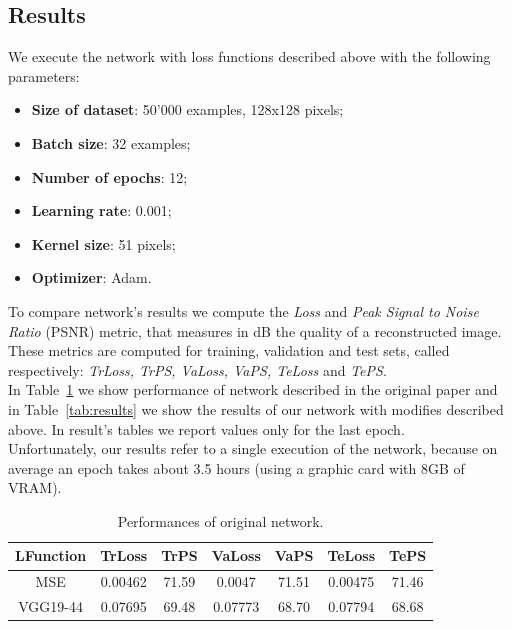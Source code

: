\documentclass[11pt, a4paper]{article}
\begin{document}
	\subsection{Results}
	We execute the network with loss functions described above with the following parameters:
	\begin{itemize}
		\item \textbf{Size of dataset}: 50'000 examples, 128x128 pixels;
		\item \textbf{Batch size}: 32 examples;
		\item \textbf{Number of epochs}: 12;
		\item \textbf{Learning rate}: 0.001;
		\item \textbf{Kernel size}: 51 pixels;
		\item \textbf{Optimizer}: Adam.
	\end{itemize}
	To compare network's results we compute the \textit{Loss} and \textit{Peak Signal to Noise Ratio} (PSNR) metric, that measures in dB the quality of a reconstructed image. These metrics are computed for training, validation and test sets, called respectively: \textit{TrLoss, TrPS, VaLoss, VaPS, TeLoss} and \textit{TePS}.\\
	In Table~\ref{tab:old_results} we show performance of network described in the original paper \cite{mainpaper} and in Table~\ref{tab:results} we show the results of our network with modifies described above. In result's tables we report values only for the last epoch.\\
	Unfortunately, our results refer to a single execution of the network, because on average an epoch takes about 3.5 hours (using a graphic card with 8GB of VRAM). 

	\begin{table}
		\centering
		\begin{tabular}{|c|c|c|c|c|c|c|}
			\hline
			\textbf{LFunction} & \textbf{TrLoss} & \textbf{TrPS} & \textbf{VaLoss} & \textbf{VaPS} & \textbf{TeLoss} & \textbf{TePS}\\
			\hline
			MSE & 0.00462 & 71.59 & 0.0047 & 71.51 & 0.00475 & 71.46\\
			\hline
			VGG19-44 & 0.07695 & 69.48 & 0.07773 & 68.70 & 0.07794 & 68.68\\
			\hline
		\end{tabular}
		\caption{Performances of original network.}
		\label{tab:old_results}
	\end{table}
\end{document}
